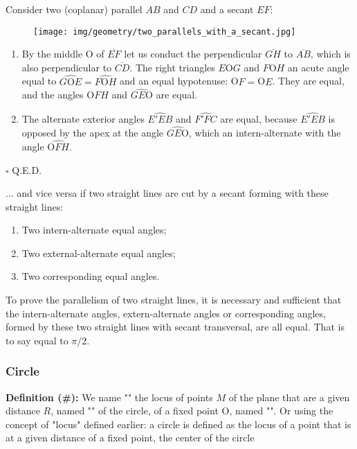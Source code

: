 	\begin{dem}
	Consider two (coplanar) parallel $AB$ and $CD$ and a secant $EF$:
	\begin{figure}[H]
		\centering
		\texttt{[image: img/geometry/two\_parallels\_with\_a\_secant.jpg]}
	\end{figure}
	\begin{enumerate}
		\item By the middle O of $\overline{EF}$ let us conduct the perpendicular $\overline{GH}$ to $\overline{AB}$, which is also perpendicular to $\overline{CD}$. The right triangles $E$O$G$ and $F$O$H$ an acute angle equal to $\widehat{G\text{O}E}=\widehat{F\text{O}H}$ and an equal hypotenuse: O$F = $O$E$. They are equal, and the angles $\widehat{\text{O}FH}$ and $\widehat{GE\text{O}}$ are equal.

		\item The alternate exterior angles $\widehat{E'EB}$ and $\widehat{F'FC}$ are equal, because $\widehat{E'EB}$ is opposed by the apex at the angle $\widehat{GE\text{O}}$, which an intern-alternate with the angle $\widehat{\text{O}FH}$.
	\end{enumerate}
	\begin{flushright}
		$\square$  Q.E.D.
	\end{flushright}
	\end{dem}
	... and vice versa if two straight lines are cut by a secant forming with these straight lines:
	\begin{enumerate}
		\item Two intern-alternate equal angles;
		\item Two external-alternate equal angles;
		\item Two corresponding equal angles.
	\end{enumerate} 
	\begin{tcolorbox}[title=Remark,colframe=black,arc=10pt]
	To prove the parallelism of two straight lines, it is necessary and sufficient that the intern-alternate angles, extern-alternate angles or corresponding angles, formed by these two straight lines with secant transversal, are all equal. That is to say equal to $\pi/2$.
	\end{tcolorbox}
	
	\pagebreak
	\subsubsection{Circle}
	\textbf{Definition (\#\mydef):} We name "" the locus of points $M$ of the plane that are a given distance $R$, named "" of the circle, of a fixed point O, named "". Or using the concept of "locus" defined earlier:  a circle is defined as the locus of a point that is at a given distance of a fixed point, the center of the circle
	
